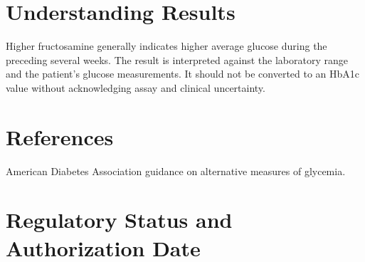 \section*{Understanding Results}
Higher fructosamine generally indicates higher average glucose during the preceding several weeks. The result is interpreted against the laboratory range and the patient's glucose measurements. It should not be converted to an HbA1c value without acknowledging assay and clinical uncertainty.

\section*{References}
American Diabetes Association guidance on alternative measures of glycemia.

\clearpage


\section*{Regulatory Status and Authorization Date}

\clearpage
